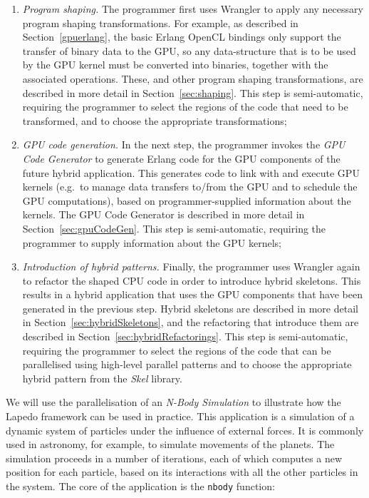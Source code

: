 \documentclass[final]{jfp1}
\newcommand{\lapedo}{\xspace{\sc Lapedo}\xspace}
\newcommand{\Lapedo}{\lapedo}
\begin{document}
\begin{enumerate}
\item \emph{Program shaping.}
The programmer first uses Wrangler to apply any necessary
program shaping transformations. 
For example, as described in Section~\ref{gpuerlang}, 
the basic Erlang OpenCL bindings only support the transfer of binary data 
to the GPU, so any data-structure that is to be used by the GPU kernel 
must be converted into binaries, together with the associated operations. These, and other 
program shaping transformations, are described in more detail in 
Section~\ref{sec:shaping}. This step is semi-automatic, requiring
the programmer to select the regions of the code that need to be
transformed, and to choose the appropriate transformations;
\item \emph{GPU code generation.} In the next step, the programmer invokes the 
\emph{GPU Code Generator} to generate Erlang code for the GPU components of the
future hybrid application. 
This generates code to link with and execute GPU kernels
(e.g.\ to manage data transfers to/from the GPU and to schedule the GPU 
computations),
based on programmer-supplied information about the kernels.
The GPU Code Generator is described in more detail in
Section~\ref{sec:gpuCodeGen}. This step is semi-automatic,
requiring the programmer to supply information about the GPU kernels;
\item \emph{Introduction of hybrid patterns.} Finally, the programmer uses
Wrangler again to refactor the shaped CPU code in order to introduce 
hybrid skeletons. This results in a hybrid application that uses the GPU components
that have been generated in the previous step. Hybrid skeletons are described in more
detail in Section~\ref{sec:hybridSkeletons}, and the refactoring that
introduce them are described in Section~\ref{sec:hybridRefactorings}. 
This step is semi-automatic, requiring the programmer to
select the regions of the code that can be parallelised using high-level
parallel patterns and to choose the appropriate hybrid pattern from the \emph{Skel} library.
\end{enumerate}

\noindent
We will use the parallelisation of an \emph{N-Body Simulation} to
illustrate how the \Lapedo{} framework can be used in practice.
This application is a simulation of
a dynamic system of particles under the influence of external forces. It
is commonly used in astronomy, for example, to simulate movements of the
planets.  The simulation proceeds in a number of iterations, each of
which computes a new position for each particle, based on its
interactions with all the other particles in the system. The core of the
application is the \lstinline{nbody} function:
\end{document}
